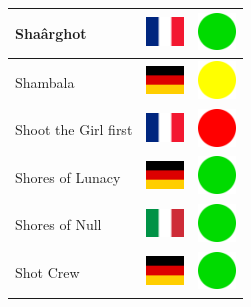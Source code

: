 \documentclass[12pt, a4paper, twoside]{report}
\begin{document}
\begin{center}
\begin{longtable}{|p{5cm}|p{2cm}|p{2cm}|}
Shaârghot & \includegraphics[width=1cm]{4x3/fr} & \includegraphics[width=1cm]{likes/y} \\ \hline
Shambala & \includegraphics[width=1cm]{4x3/de} & \includegraphics[width=1cm]{likes/m} \\ \hline
Shoot the Girl first & \includegraphics[width=1cm]{4x3/fr} & \includegraphics[width=1cm]{likes/n} \\ \hline
Shores of Lunacy & \includegraphics[width=1cm]{4x3/de} & \includegraphics[width=1cm]{likes/y} \\ \hline
Shores of Null & \includegraphics[width=1cm]{4x3/it} & \includegraphics[width=1cm]{likes/y} \\ \hline
Shot Crew & \includegraphics[width=1cm]{4x3/de} & \includegraphics[width=1cm]{likes/y} \\ \hline

\end{longtable}
\end{center}
\end{document}
